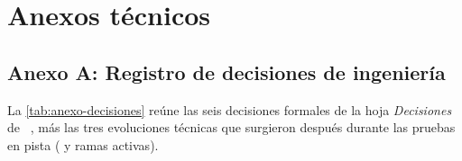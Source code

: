 \section{Anexos técnicos}
\label{sec:anexos}

\subsection{Anexo A: Registro de decisiones de ingeniería}
\label{subsec:anexo-decisiones}

La \cref{tab:anexo-decisiones} reúne las seis decisiones formales de la hoja \emph{Decisiones} de ~\cite{excel2026organizacion}, más las tres evoluciones técnicas que surgieron después durante las pruebas en pista ( y ramas activas).

